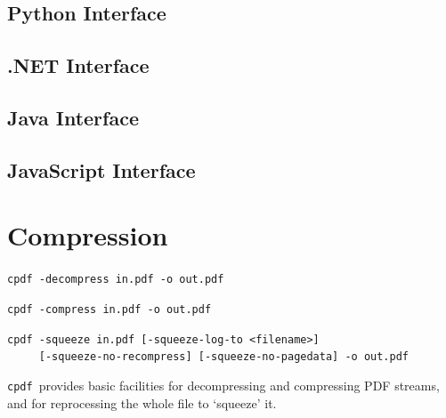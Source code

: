 \documentclass{book}
\newcommand{\cpdf}{\texttt{cpdf}}
\begin{document}
\begin{pycpdflib}
\clearpage
\section*{Python Interface}
\begin{small}\tt

\end{small}
\end{pycpdflib}

\begin{dotnetcpdflib}
\clearpage
\section*{.NET Interface}
\begin{small}\tt

\end{small}
\end{dotnetcpdflib}

\begin{jcpdflib}
\clearpage
\section*{Java Interface}
\begin{small}\tt

\end{small}
\end{jcpdflib}

\begin{jscpdflib}
\clearpage
\section*{JavaScript Interface}
\begin{small}\tt

\end{small}
\end{jscpdflib}

\chapter{Compression}\label{chap:5}
  \begin{framed}
     \small\noindent\verb!cpdf -decompress in.pdf -o out.pdf!

     \vspace{1.5mm}
     \noindent\verb!cpdf -compress in.pdf -o out.pdf!
     
     \vspace{1.5mm}
     \noindent\verb!cpdf -squeeze in.pdf [-squeeze-log-to <filename>]!\\
     \noindent\verb!     [-squeeze-no-recompress] [-squeeze-no-pagedata] -o out.pdf!   
   \end{framed}
  \cpdf\ provides basic facilities for decompressing and compressing PDF streams, and for reprocessing the whole file to `squeeze' it.
\end{document}
